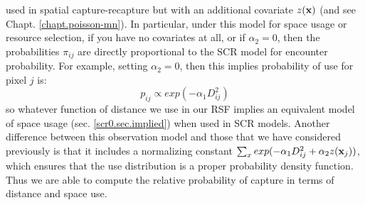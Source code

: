 used in spatial capture-recapture but with an additional covariate
$z({\bf x})$ (and see Chapt. \ref{chapt.poisson-mn}).
In particular, under this model for space usage or resource selection,
if you have no covariates at all, or if $\alpha_{2} =
0$, then
the probabilities $\pi_{ij}$ are directly proportional to the SCR
model for encounter probability.
For example, setting $\alpha_{2} = 0$, then this implies probability
of use for pixel $j$ is:
\[
p_{ij} \propto  exp( -\alpha_{1} D_{ij}^{2})
\]
so whatever function of distance we use in our RSF implies an
equivalent model of space usage (sec. \ref{scr0.sec.implied})
when used in SCR models. Another difference between this observation model
and those that we have considered previously is that it includes a
normalizing constant $\sum_{x} exp(-\alpha_{1} D_{ij}^{2} +\alpha_{2}
z({\bf x}_{j}))$, which ensures that the use distribution is a 
proper probability density function. Thus we are able to compute
the relative probability of capture in terms of distance and space use.

